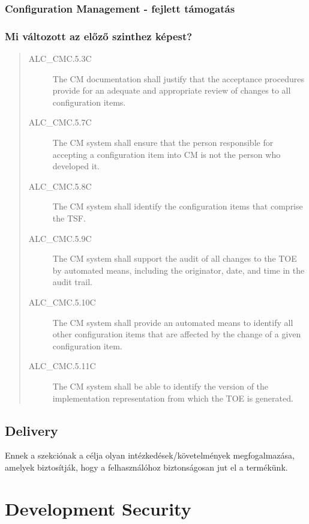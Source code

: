 \subsubsection{Configuration Management - fejlett támogatás}
\subsubsection{Mi változott az előző szinthez képest?}
\begin{quote}
    \begin{description}
        \item[ALC\_CMC.5.3C]{The CM documentation shall justify that the acceptance procedures
            provide for an adequate and appropriate review of changes to all configuration items.}
        \item[ALC\_CMC.5.7C]{The CM system shall ensure that the person responsible for accepting a
            configuration item into CM is not the person who developed it.}
        \item[ALC\_CMC.5.8C]{The CM system shall identify the configuration items that comprise the
            TSF.}
        \item[ALC\_CMC.5.9C]{The CM system shall support the audit of all changes to the TOE by
            automated means, including the originator, date, and time in the audit trail.}
        \item[ALC\_CMC.5.10C]{The CM system shall provide an automated means to identify all other
            configuration items that are affected by the change of a given configuration item.}
        \item[ALC\_CMC.5.11C]{The CM system shall be able to identify the version of the
            implementation representation from which the TOE is generated.}
    \end{description}
\end{quote}

\pagebreak[2]
\subsection{Delivery}

Ennek a szekciónak a célja olyan intézkedések/követelmények megfogalmazása, amelyek
biztosítják, hogy a felhasználóhoz biztonságosan jut el a termékünk.

\section{Development Security}

